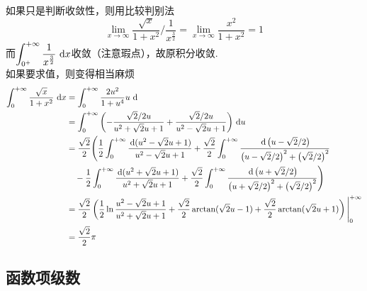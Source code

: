 \begin{analysis}
如果只是判断收敛性，则用比较判别法
\[\lim_{x\to\infty}\dfrac{\sqrt{x}}{1+x^2}\Big/\dfrac{1}{x^{\frac{3}{2}}}=\lim_{x\to\infty}\dfrac{x^2}{1+x^2}=1\]
而$\displaystyle\int_{0^+}^{+\infty}{\dfrac{1}{x^{\frac{3}{2}}}}\,\,\mathrm{d} x$收敛（注意瑕点），故原积分收敛.\\
如果要求值，则变得相当麻烦
\[\begin{aligned}
  \displaystyle\int_{0}^{+\infty}{\dfrac{\sqrt{x}}{1+x^2}}\,\,\mathrm{d} x
  &=\displaystyle\int_{0}^{+\infty}{\dfrac{2u^2}{1+u^4}{u}}\,\,\mathrm{d} \\
  &=\displaystyle\int_{0}^{+\infty}{\left(-\dfrac{\sqrt{2}/2u}{u^2+\sqrt{2}u+1}+\dfrac{\sqrt{2}/2u}{u^2-\sqrt{2}u+1}\right)}\,\,\mathrm{d} u\\
  &=\dfrac{\sqrt{2}}{2}\Bigg(\dfrac{1}{2}\int_0^{+\infty}\dfrac{\,\mathrm{d}(u^2-\sqrt{2}u+1)}{u^2-\sqrt{2}u+1}+\dfrac{\sqrt{2}}{2}\int_0^{+\infty}\dfrac{\,\mathrm{d}\left(u-\sqrt{2}/{2}\right)}{\left(u-\sqrt{2}/{2}\right)^2+\left(\sqrt{2}/{2}\right)^2}\\
  &\quad-\dfrac{1}{2}\int_0^{+\infty}\dfrac{\,\mathrm{d}(u^2+\sqrt{2}u+1)}{u^2+\sqrt{2}u+1}+\dfrac{\sqrt{2}}{2}\int_0^{+\infty}\dfrac{\,\mathrm{d}\left(u+\sqrt{2}/{2}\right)}{\left(u+\sqrt{2}/{2}\right)^2+\left(\sqrt{2}/{2}\right)^2}\Bigg)\\
  &=\dfrac{\sqrt{2}}{2}\left(\dfrac{1}{2}\ln\dfrac{u^2-\sqrt{2}u+1}{u^2+\sqrt{2}u+1}+\dfrac{\sqrt{2}}{2}\arctan(\sqrt{2}u-1)+\dfrac{\sqrt{2}}{2}\arctan(\sqrt{2}u+1)\right)\Bigg|_0^{+\infty}\\
  &=\dfrac{\sqrt{2}}{2}\pi                   
\end{aligned}\]
\end{analysis}

\subsection{函数项级数}
